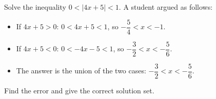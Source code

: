 Solve the inequality $0<|4x+5|<1$. A student argued as follows:
\begin{itemize}
\item If $4x+5>0$: $0<4x+5<1$, so $-\dfrac{5}{4}<x<-1$.
\item If $4x+5<0$: $0<-4x-5<1$, so $-\dfrac{3}{2}<x<-\dfrac{5}{6}$.
\item The answer is the union of the two cases: $-\dfrac{3}{2}<x<-\dfrac{5}{6}$.
\end{itemize}
Find the error and give the correct solution set.
